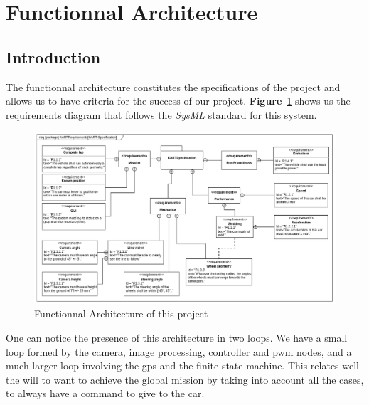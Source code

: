 \section{Functionnal Architecture}

\subsection{Introduction}
The functionnal architecture constitutes the specifications of the project and allows us to have criteria
for the success of our project. \textbf{Figure}~\ref{fig:requirement} shows us the requirements
diagram that follows the \textit{SysML} standard for this system.

\begin{figure}[!ht]
    \begin{center}
        \includegraphics[width=\textwidth]{Images/requirement.png}
    \end{center}
    \caption{Functionnal Architecture of this project}
    \label{fig:requirement}
\end{figure}

One can notice the presence of this architecture in two loops. We have a small loop formed
by the camera, image processing, controller and pwm nodes, and a much larger loop involving
the gps and the finite state machine. This relates well the will to want to achieve the
global mission by taking into account all the cases, to always have a command to give to
the car.

\newpage
